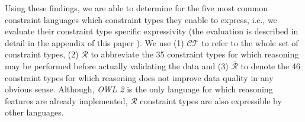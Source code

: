 \documentclass{acm_proc_article-sp}
\newcommand{\ms}[1]{%
  \texttt{#1}
}
\newcommand{\tb}[1]{\todo[size=\small, color=green!40]{\textbf{Thomas:} #1}}
\newcommand{\er}[1]{\todo[size=\small, color=red!40]{\textbf{Erman:} #1}}
\newenvironment{evaluation}{
  \begin{tabular}{l|c|c|c|c|c|c}
  \hline
  \textbf{Constraint Class} & \textbf{DSP} & \textbf{OWL2-DL} & \textbf{OWL2-QL} & \textbf{ReSh} & \textbf{ShEx} & \textbf{SPIN} \\
  \hline

}{
  \hline
  \end{tabular}
  \linebreak
}
\begin{document}
Using these findings, we are able to determine for the five most common constraint languages which constraint types they enable to express, i.e., we evaluate their constraint type specific expressivity (the evaluation is described in detail in the appendix of this paper \cite{BoschNolleAcarEckert2015}).
We use 
(1) $\mathcal{CT}$ to refer to the whole set of constraint types,
(2) $\mathcal{R}$ to abbreviate the 35 constraint types for which reasoning may be performed before actually validating the data and
(3) $\overline{\mathcal{R}}$ to denote the 46 constraint types for which reasoning does not improve data quality in any obvious sense.
Although, \emph{OWL 2} is the only language for which reasoning features are already implemented, 
$\mathcal{R}$ constraint types are also expressible by other languages. 
\end{document}
